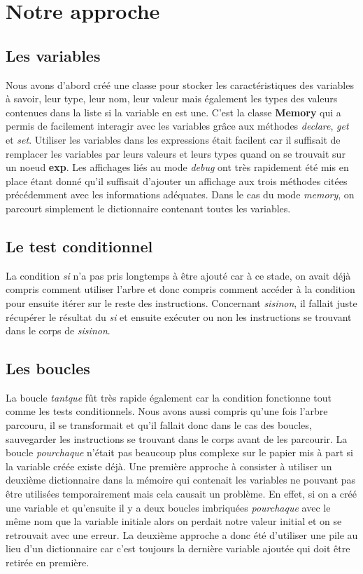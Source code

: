 \section{Notre approche}
\subsection{Les variables}
Nous avons d'abord créé une classe pour stocker les caractéristiques des variables à savoir, leur type, leur nom, leur valeur
mais également les types des valeurs contenues dans la liste si la variable en est une.
C'est la classe \textbf{Memory} qui a permis de facilement interagir avec les variables grâce aux méthodes \textit{declare}, \textit{get} et \textit{set}.
Utiliser les variables dans les expressions était facilent car il suffisait de remplacer les variables par leurs valeurs et leurs types
quand on se trouvait sur un noeud \textbf{exp}.
Les affichages liés au mode \textit{debug} ont très rapidement été mis en place étant donné qu'il suffisait d'ajouter
un affichage aux trois méthodes citées précédemment avec les informations adéquates.
Dans le cas du mode \textit{memory}, on parcourt simplement le dictionnaire contenant toutes les variables.

\subsection{Le test conditionnel}
La condition \textit{si} n'a pas pris longtemps à être ajouté car à ce stade, on avait déjà compris comment utiliser l'arbre et
donc compris comment accéder à la condition pour ensuite itérer sur le reste des instructions. 
Concernant \textit{sisinon}, il fallait juste récupérer le résultat du \textit{si} et ensuite exécuter ou non
les instructions se trouvant dans le corps de \textit{sisinon}.

\subsection{Les boucles}
La boucle \textit{tantque} fût très rapide également car la condition fonctionne tout comme les tests conditionnels.
Nous avons aussi compris qu'une fois l'arbre parcouru, il se transformait et qu'il fallait donc dans le cas des boucles,
sauvegarder les instructions se trouvant dans le corps avant de les parcourir.
La boucle \textit{pourchaque} n'était pas beaucoup plus complexe sur le papier mis à part si la variable créée existe déjà.
Une première approche à consister à utiliser un deuxième dictionnaire dans la mémoire qui contenait les variables ne pouvant pas être utilisées temporairement
mais cela causait un problème.
En effet, si on a créé une variable et qu'ensuite il y a deux boucles imbriquées \textit{pourchaque} avec le même nom que la variable initiale
alors on perdait notre valeur initial et on se retrouvait avec une erreur.
La deuxième approche a donc été d'utiliser une pile au lieu d'un dictionnaire car c'est toujours la dernière variable ajoutée qui doit être retirée en première.

